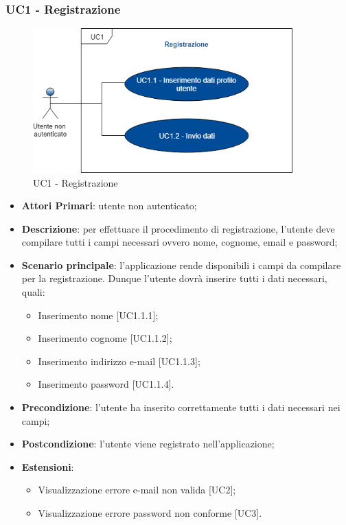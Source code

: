 \subsubsection{UC1 - Registrazione}
\begin{figure}
	\includegraphics[width=10cm]{res/images/UC1Registrazione.png}
	\centering
	\caption{UC1 - Registrazione}
\end{figure}
\begin{itemize}
	\item \textbf{Attori Primari}: utente non autenticato;
	\item \textbf{Descrizione}: per effettuare il procedimento di registrazione, l'utente deve compilare tutti i campi necessari ovvero nome, cognome, email e password;
	\item \textbf{Scenario principale}: l'applicazione rende disponibili i campi da compilare per la registrazione. Dunque l'utente dovrà inserire tutti i dati necessari, quali:
		\begin{itemize}
			\item Inserimento nome [UC1.1.1];
			\item Inserimento cognome [UC1.1.2];
			\item Inserimento indirizzo e-mail [UC1.1.3];
			\item Inserimento password [UC1.1.4].
		\end{itemize}
	\item \textbf{Precondizione}: l'utente ha inserito correttamente tutti i dati necessari nei campi;
	\item \textbf{Postcondizione}: l'utente viene registrato nell'applicazione;
	\item \textbf{Estensioni}:
		\begin{itemize}
			\item Visualizzazione errore e-mail non valida [UC2];
			\item Visualizzazione errore password non conforme [UC3]. 
		\end{itemize} 
\end{itemize}
